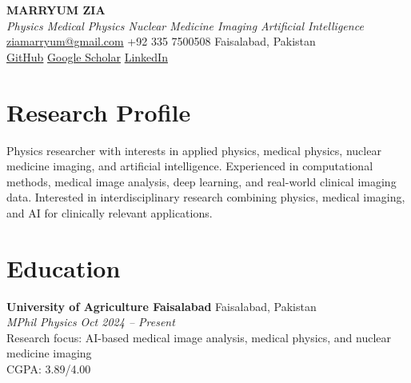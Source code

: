 \documentclass[10.5pt,a4paper]{article}
\begin{document}

\begin{center}

    {\LARGE \textbf{MARRYUM ZIA}}\\[4pt]

    \textit{Physics \textbar{} Medical Physics \textbar{} Nuclear Medicine Imaging \textbar{} Artificial Intelligence}\\[5pt]

    \href{mailto:ziamarryum@gmail.com}{ziamarryum@gmail.com}
    \textbar{}
    +92 335 7500508
    \textbar{}
    Faisalabad, Pakistan\\[3pt]

    \href{https://github.com/Marryum20}{GitHub}
    \textbar{}
    \href{https://scholar.google.com/citations?view_op=new_articles&hl=en&imq=Marryum+Zia#}{Google Scholar}
    \textbar{}
    \href{https://www.linkedin.com/in/marryum-zia-3408a1243/}{LinkedIn}

\end{center}



\section{Research Profile}

Physics researcher with interests in applied physics, medical physics, nuclear medicine imaging, and artificial intelligence. Experienced in computational methods, medical image analysis, deep learning, and real-world clinical imaging data. Interested in interdisciplinary research combining physics, medical imaging, and AI for clinically relevant applications.



\section{Education}

\textbf{University of Agriculture Faisalabad}
\hfill Faisalabad, Pakistan\\
\textit{MPhil Physics}
\hfill \textit{Oct 2024 -- Present}\\
Research focus: AI-based medical image analysis, medical physics, and
nuclear medicine imaging\\
CGPA: 3.89/4.00
\end{document}

